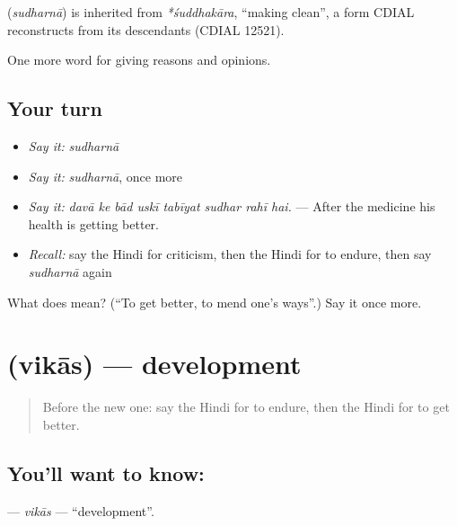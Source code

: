 \begin{cousinweb}
\textbf{} (\emph{sudharnā}) is inherited from \emph{*śuddhakāra}, \textquotedblleft{}making clean\textquotedblright{}, a form CDIAL reconstructs from its descendants (CDIAL 12521).
\end{cousinweb}

\begin{grammarlens}[title={What you've built}]
One more word for giving reasons and opinions.
\end{grammarlens}

\subsection*{Your turn}
\begin{itemize}
\raggedright
  \item \emph{Say it:} \emph{sudharnā}
  \item \emph{Say it:} \emph{sudharnā}, once more
  \item \emph{Say it:} \emph{davā ke bād uskī tabīyat sudhar rahī hai.} — After the medicine his health is getting better.
  \item \emph{Recall:} say the Hindi for criticism, then the Hindi for to endure, then say \emph{sudharnā} again
\end{itemize}

\begin{tcolorbox}[breakable,colback=teal!4,colframe=teal!35!black,title={Before you move on}]
What does  mean? (\textquotedblleft{}To get better, to mend one's ways\textquotedblright{}.) Say it once more.
\end{tcolorbox}
\section[\texorpdfstring{\hi{विकास} (vikās)}{विकास (vikās)}]{ (vikās) — development}

\label{lesson:HI-C368-vikas}



\begin{quote}
Before the new one: say the Hindi for to endure, then the Hindi for to get better.
\end{quote}

\subsection*{You'll want to know: }
\textbf{} — \emph{vikās} — \textquotedblleft{}development\textquotedblright{}.

